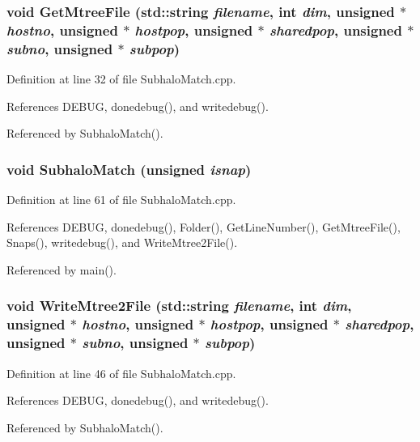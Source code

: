 \subsubsection[{GetMtreeFile}]{\setlength{\rightskip}{0pt plus 5cm}void GetMtreeFile (std::string {\em filename}, \/  int {\em dim}, \/  unsigned $\ast$ {\em hostno}, \/  unsigned $\ast$ {\em hostpop}, \/  unsigned $\ast$ {\em sharedpop}, \/  unsigned $\ast$ {\em subno}, \/  unsigned $\ast$ {\em subpop})}\label{SubhaloMatch_8cpp_ae34577f1a286844fa56a04e4b24ec05e}


Definition at line 32 of file SubhaloMatch.cpp.



References DEBUG, donedebug(), and writedebug().



Referenced by SubhaloMatch().

\subsubsection[{SubhaloMatch}]{\setlength{\rightskip}{0pt plus 5cm}void SubhaloMatch (unsigned {\em isnap})}\label{SubhaloMatch_8cpp_a3d5bcfb515b1e1099036e4e60a70dccb}


Definition at line 61 of file SubhaloMatch.cpp.



References DEBUG, donedebug(), Folder(), GetLineNumber(), GetMtreeFile(), Snaps(), writedebug(), and WriteMtree2File().



Referenced by main().

\subsubsection[{WriteMtree2File}]{\setlength{\rightskip}{0pt plus 5cm}void WriteMtree2File (std::string {\em filename}, \/  int {\em dim}, \/  unsigned $\ast$ {\em hostno}, \/  unsigned $\ast$ {\em hostpop}, \/  unsigned $\ast$ {\em sharedpop}, \/  unsigned $\ast$ {\em subno}, \/  unsigned $\ast$ {\em subpop})}\label{SubhaloMatch_8cpp_a17a904dce21502eb2b5503075c28340c}


Definition at line 46 of file SubhaloMatch.cpp.



References DEBUG, donedebug(), and writedebug().



Referenced by SubhaloMatch().

